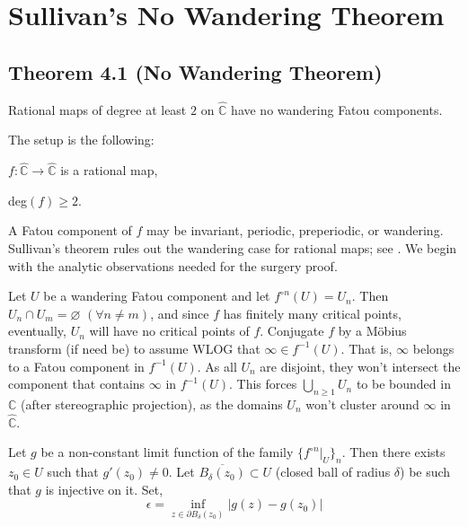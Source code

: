 \documentclass[11pt,a4paper]{article}
\begin{document}
\section*{Sullivan's No Wandering Theorem}

        \subsection*{Theorem 4.1 (No Wandering Theorem)}
        Rational maps of degree at least $2$ on $\hat{\mathbb{C}}$ have no wandering Fatou components.



        The setup is the following:


$f: \hat{\mathbb{C}} \rightarrow \hat{\mathbb{C}}$ is a rational map,


deg$(f) \geq 2$.




        A Fatou component of $f$ may be invariant, periodic, preperiodic, or wandering. Sullivan's theorem rules out the wandering case for rational maps; see \cite{branner2014quasiconformal,sullivan1985quasiconformal}. We begin with the analytic observations needed for the surgery proof.

        Let $U$ be a wandering Fatou component and let $f^{\circ n}(U) = U_n$. Then $U_n \cap U_m = \varnothing$ $(\forall n \neq m)$, and since $f$ has finitely many critical points, eventually, $U_n$ will have no critical points of $f$. Conjugate $f$ by a M\"obius transform (if need be) to assume WLOG that $\infty \in f^{-1}(U)$. That is, $\infty$ belongs to a Fatou component in $f^{-1}(U)$. As all $U_n$ are disjoint, they won't intersect the component that contains $\infty$ in $f^{-1}(U)$. This forces $\bigcup_{n\geq 1}U_n$ to be bounded in $\mathbb{C}$ (after stereographic projection), as the domains $U_n$ won't cluster around $\infty$ in $\hat{\mathbb{C}}$.

        Let $g$ be a non-constant limit function of the family $\{f^{\circ n}\big|_U\}_n$. Then there exists $z_0 \in U$ such that $g'(z_0) \neq 0$. Let $\overline{B_{\delta}(z_0)} \subset U$ (closed ball of radius $\delta$) be such that $g$ is injective on it. Set,
        $$\epsilon = \inf_{z\in \partial B_{\delta}(z_0)}{|g(z)-g(z_0)|}$$
\end{document}
